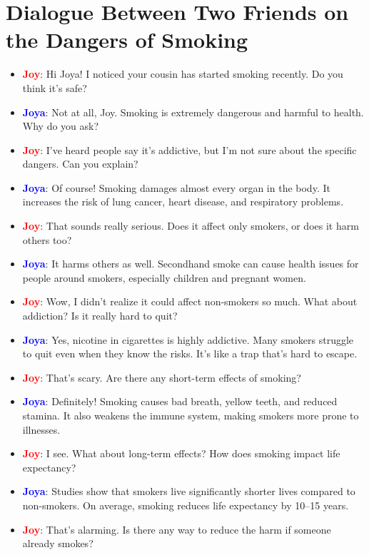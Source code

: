 \documentclass{article}
\begin{document}
\section*{Dialogue Between Two Friends on the Dangers of Smoking}
\begin{itemize}
    \item \textbf{\textcolor{red}{Joy}}: Hi Joya! I noticed your cousin has started smoking recently. Do you think it’s safe?
    \item \textbf{\textcolor{blue}{Joya}}: Not at all, Joy. Smoking is extremely dangerous and harmful to health. Why do you ask?
    \item \textbf{\textcolor{red}{Joy}}: I’ve heard people say it’s addictive, but I’m not sure about the specific dangers. Can you explain?
    \item \textbf{\textcolor{blue}{Joya}}: Of course! Smoking damages almost every organ in the body. It increases the risk of lung cancer, heart disease, and respiratory problems.
    \item \textbf{\textcolor{red}{Joy}}: That sounds really serious. Does it affect only smokers, or does it harm others too?
    \item \textbf{\textcolor{blue}{Joya}}: It harms others as well. Secondhand smoke can cause health issues for people around smokers, especially children and pregnant women.
    \item \textbf{\textcolor{red}{Joy}}: Wow, I didn’t realize it could affect non-smokers so much. What about addiction? Is it really hard to quit?
    \item \textbf{\textcolor{blue}{Joya}}: Yes, nicotine in cigarettes is highly addictive. Many smokers struggle to quit even when they know the risks. It’s like a trap that’s hard to escape.
    \item \textbf{\textcolor{red}{Joy}}: That’s scary. Are there any short-term effects of smoking?
    \item \textbf{\textcolor{blue}{Joya}}: Definitely! Smoking causes bad breath, yellow teeth, and reduced stamina. It also weakens the immune system, making smokers more prone to illnesses.
    \item \textbf{\textcolor{red}{Joy}}: I see. What about long-term effects? How does smoking impact life expectancy?
    \item \textbf{\textcolor{blue}{Joya}}: Studies show that smokers live significantly shorter lives compared to non-smokers. On average, smoking reduces life expectancy by 10–15 years.
    \item \textbf{\textcolor{red}{Joy}}: That’s alarming. Is there any way to reduce the harm if someone already smokes?

\end{itemize}
\end{document}
